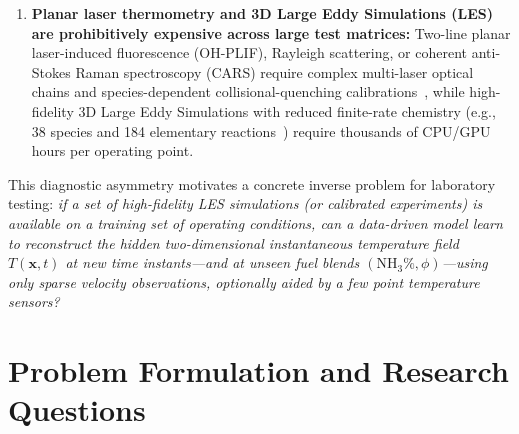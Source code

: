 \begin{enumerate}
    \item \textbf{Planar laser thermometry and 3D Large Eddy Simulations (LES) are prohibitively expensive across large test matrices:} Two-line planar laser-induced fluorescence (OH-PLIF), Rayleigh scattering, or coherent anti-Stokes Raman spectroscopy (CARS) require complex multi-laser optical chains and species-dependent collisional-quenching calibrations~\cite{kohse2005applied}, while high-fidelity 3D Large Eddy Simulations with reduced finite-rate chemistry (e.g., 38 species and 184 elementary reactions~\cite{hu2026realpdebench}) require thousands of CPU/GPU hours per operating point.
\end{enumerate}

This diagnostic asymmetry motivates a concrete inverse problem for laboratory testing: \emph{if a set of high-fidelity LES simulations (or calibrated experiments) is available on a training set of operating conditions, can a data-driven model learn to reconstruct the hidden two-dimensional instantaneous temperature field $T(\mathbf{x}, t)$ at new time instants---and at unseen fuel blends $(\text{NH}_3\%, \phi)$---using only sparse velocity observations, optionally aided by a few point temperature sensors?}

\section{Problem Formulation and Research Questions}
\label{sec:intro_questions}

